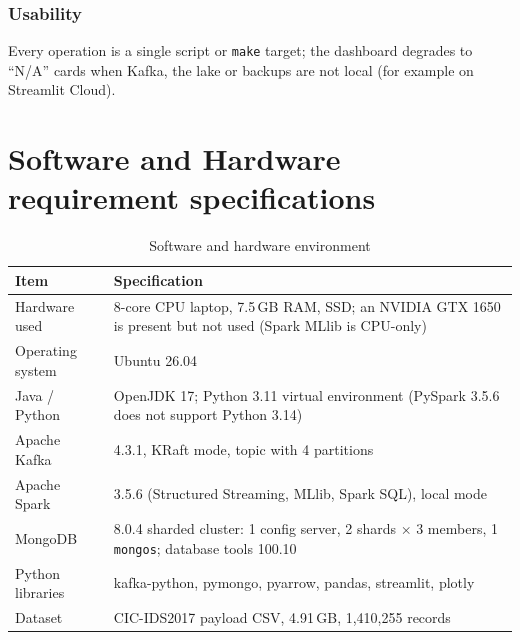\subsubsection{Usability}
Every operation is a single script or \texttt{make} target; the dashboard degrades to ``N/A'' cards when Kafka, the lake or backups are not local (for example on Streamlit Cloud).

\section{Software and Hardware requirement specifications}
\begin{table}[H]
\centering
\begin{tabular}{|p{4cm}|p{9cm}|}
\hline
\textbf{Item} & \textbf{Specification} \\ \hline
Hardware used & 8-core CPU laptop, 7.5\,GB RAM, SSD; an NVIDIA GTX 1650 is present but not used (Spark MLlib is CPU-only) \\ \hline
Operating system & Ubuntu 26.04 \\ \hline
Java / Python & OpenJDK 17; Python 3.11 virtual environment (PySpark 3.5.6 does not support Python 3.14) \\ \hline
Apache Kafka & 4.3.1, KRaft mode, topic with 4 partitions \\ \hline
Apache Spark & 3.5.6 (Structured Streaming, MLlib, Spark SQL), local mode \\ \hline
MongoDB & 8.0.4 sharded cluster: 1 config server, 2 shards $\times$ 3 members, 1 \texttt{mongos}; database tools 100.10 \\ \hline
Python libraries & kafka-python, pymongo, pyarrow, pandas, streamlit, plotly \\ \hline
Dataset & CIC-IDS2017 payload CSV, 4.91\,GB, 1,410,255 records \\ \hline
\end{tabular}
\caption{Software and hardware environment}
\end{table}
